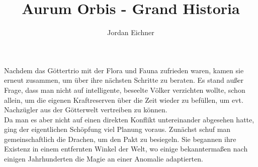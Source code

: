 \documentclass[a4paper,12pt,oneside]{book}
\title{Aurum Orbis - Grand Historia}
\author{Jordan Eichner}
\date{}
\begin{document}
\maketitle
{}
Nachdem das Göttertrio mit der Flora und Fauna zufrieden waren, kamen sie erneut zusammen, um über ihre nächsten Schritte zu beraten. Es stand außer Frage, dass man nicht auf intelligente, beseelte Völker verzichten wollte, schon allein, um die eigenen Kraftreserven über die Zeit wieder zu befüllen, um evt. Nachzügler aus der Götterwelt vertreiben zu können. 
\\Da man es aber nicht auf einen direkten Konflikt untereinander abgesehen hatte, ging der eigentlichen Schöpfung viel Planung voraus. Zunächst schuf man gemeinschaftlich die Drachen, um den Pakt zu besiegeln. Sie begannen ihre Existenz in einem entfernten Winkel der Welt, wo einige bekanntermaßen nach einigen Jahrhunderten die Magie an einer Anomalie adaptierten.
\end{document}
